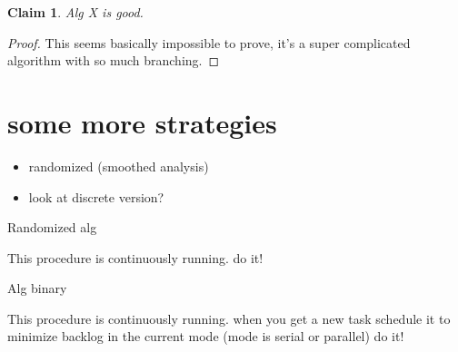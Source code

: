 \documentclass{article}[11pt]
\newtheorem{claim}{Claim}
\begin{document}
\begin{claim}
  Alg X is good.
\end{claim}
\begin{proof}
  This seems basically impossible to prove, it's a super
  complicated algorithm with so much branching. 
\end{proof}

\section{some more strategies}

\begin{itemize}
  \item randomized (smoothed analysis)
  \item look at discrete version?
\end{itemize}


\begin{algorithm}
  \caption{Randomized alg}
  \begin{algorithmic}[1]
    \State This procedure is continuously running.
    \State 
      \State do it!
    \EndIf
    \EndProcedure
  \end{algorithmic}
\end{algorithm}

\begin{algorithm}
  \caption{Alg binary}
  \begin{algorithmic}[1]
    \State This procedure is continuously running.
    \State when you get a new task schedule it to minimize
    backlog in the current mode (mode is serial or parallel)
      \State do it!
    \EndIf
    \EndProcedure
  \end{algorithmic}
\end{algorithm}
\end{document}
